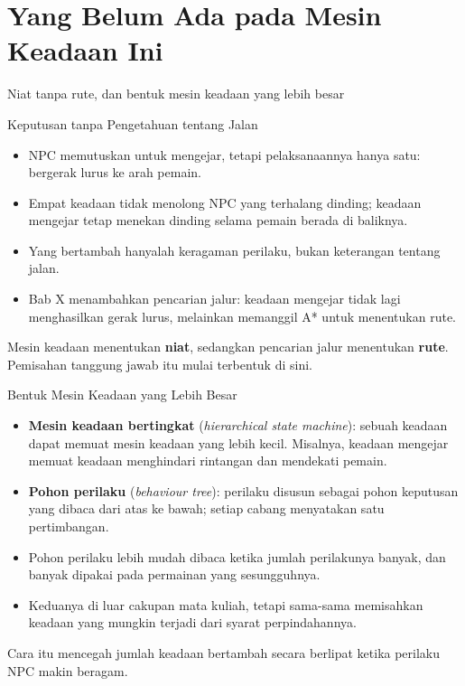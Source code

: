 \documentclass[aspectratio=169,10pt]{beamer}
\begin{document}
\section{Yang Belum Ada pada Mesin Keadaan Ini}
  {Niat tanpa rute, dan bentuk mesin keadaan yang lebih besar}

\begin{frame}{Keputusan tanpa Pengetahuan tentang Jalan}
\begin{itemize}
  \item NPC memutuskan untuk mengejar, tetapi pelaksanaannya hanya satu:
        bergerak lurus ke arah pemain.
  \item Empat keadaan tidak menolong NPC yang terhalang dinding; keadaan
        mengejar tetap menekan dinding selama pemain berada di baliknya.
  \item Yang bertambah hanyalah keragaman perilaku, bukan keterangan tentang
        jalan.
  \item Bab X menambahkan pencarian jalur: keadaan mengejar tidak lagi
        menghasilkan gerak lurus, melainkan memanggil A* untuk menentukan rute.
\end{itemize}
\vspace{0.12cm}
\begin{kotak}
Mesin keadaan menentukan \textbf{niat}, sedangkan pencarian jalur menentukan
\textbf{rute}. Pemisahan tanggung jawab itu mulai terbentuk di sini.
\end{kotak}
\end{frame}

\begin{frame}{Bentuk Mesin Keadaan yang Lebih Besar}
\begin{itemize}
  \item \textbf{Mesin keadaan bertingkat} (\emph{hierarchical state machine}):
        sebuah keadaan dapat memuat mesin keadaan yang lebih kecil. Misalnya,
        keadaan mengejar memuat keadaan menghindari rintangan dan mendekati
        pemain.
  \item \textbf{Pohon perilaku} (\emph{behaviour tree}): perilaku disusun
        sebagai pohon keputusan yang dibaca dari atas ke bawah; setiap cabang
        menyatakan satu pertimbangan.
  \item Pohon perilaku lebih mudah dibaca ketika jumlah perilakunya banyak, dan
        banyak dipakai pada permainan yang sesungguhnya.
  \item Keduanya di luar cakupan mata kuliah, tetapi sama-sama memisahkan
        keadaan yang mungkin terjadi dari syarat perpindahannya.
\end{itemize}
\vspace{0.12cm}
\begin{kotak}
Cara itu mencegah jumlah keadaan bertambah secara berlipat ketika perilaku NPC
makin beragam.
\end{kotak}
\end{frame}
\end{document}

